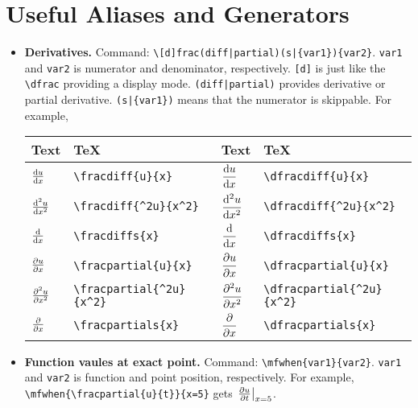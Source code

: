 \documentclass{article}
\begin{document}
\section{Useful Aliases and Generators}
\begin{itemize}
    \item \textbf{Derivatives.} Command: \lstinline`\[d]frac(diff|partial)(s|{var1}){var2}`. \lstinline`var1` and \lstinline`var2` is numerator and denominator, respectively. \lstinline`[d]` is just like the \lstinline`\dfrac` providing a display mode. \lstinline`(diff|partial)` provides derivative or partial derivative. \lstinline`(s|{var1})` means that the numerator is skippable. For example,

          \renewcommand{\arraystretch}{2}
          \begin{tabular}{*{4}{l}}
              \toprule
              Text                     & \TeX                     & Text                      & \TeX                     \\
              \midrule
              ${\frac{\operatorname{d\!} {u}}{\operatorname{d\!} {x}}}$        & \lstinline`\fracdiff{u}{x}` & ${\dfrac{\operatorname{d\!} {u}}{\operatorname{d\!} {x}}}$        & \lstinline`\dfracdiff{u}{x}` \\
              ${\frac{\operatorname{d\!} {^2u}}{\operatorname{d\!} {x^2}}}$    & \lstinline`\fracdiff{^2u}{x^2}` & ${\dfrac{\operatorname{d\!} {^2u}}{\operatorname{d\!} {x^2}}}$    & \lstinline`\dfracdiff{^2u}{x^2}` \\
              ${{\frac{\operatorname{d\!} {}}{\operatorname{d\!} {x}}}}$          & \lstinline`\fracdiffs{x}` & ${{\dfrac{\operatorname{d\!} {}}{\operatorname{d\!} {x}}}}$          & \lstinline`\dfracdiffs{x}` \\
              ${\frac{\partial {u}}{\partial {x}}}$     & \lstinline`\fracpartial{u}{x}` & ${\dfrac{\partial {u}}{\partial {x}}}$     & \lstinline`\dfracpartial{u}{x}` \\
              ${\frac{\partial {^2u}}{\partial {x^2}}}$ & \lstinline`\fracpartial{^2u}{x^2}` & ${\dfrac{\partial {^2u}}{\partial {x^2}}}$ & \lstinline`\dfracpartial{^2u}{x^2}` \\
              ${{\frac{\partial {}}{\partial {x}}}}$       & \lstinline`\fracpartials{x}` & ${{\dfrac{\partial {}}{\partial {x}}}}$       & \lstinline`\dfracpartials{x}` \\
              \bottomrule
          \end{tabular}
          \renewcommand{\arraystretch}{1.25}

    \item \textbf{Function vaules at exact point.} Command: \lstinline`\mfwhen{var1}{var2}`. \lstinline`var1` and \lstinline`var2` is function and point position, respectively. For example, \lstinline`\mfwhen{\fracpartial{u}{t}}{x=5}` gets ${\left.{{\frac{\partial {u}}{\partial {t}}}} \right|}_{x=5}$.


\end{itemize}
\end{document}
